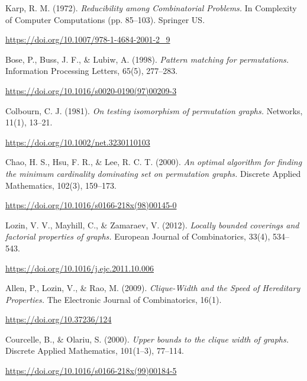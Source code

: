 \begin{thebibliography}{99}
     Karp, R. M. (1972).
    \textit{Reducibility among Combinatorial Problems. }
    In Complexity of Computer Computations (pp. 85–103). Springer US.

    \url{https://doi.org/10.1007/978-1-4684-2001-2_9}

     Bose, P., Buss, J. F., \& Lubiw, A. (1998).
    \textit{Pattern matching for permutations.}
    Information Processing Letters, 65(5), 277–283.

    \url{https://doi.org/10.1016/s0020-0190(97)00209-3}

     Colbourn, C. J. (1981).
    \textit{On testing isomorphism of permutation graphs.}
    Networks, 11(1), 13–21.

    \url{https://doi.org/10.1002/net.3230110103}

     Chao, H. S., Hsu, F. R., \& Lee, R. C. T. (2000).
    \textit{An optimal algorithm for finding the minimum cardinality dominating set on permutation graphs.}
    Discrete Applied Mathematics, 102(3), 159–173.

    \url{https://doi.org/10.1016/s0166-218x(98)00145-0}

     Lozin, V. V., Mayhill, C., \& Zamaraev, V. (2012).
    \textit{Locally bounded coverings and factorial properties of graphs.}
    European Journal of Combinatorics, 33(4), 534–543.

    \url{https://doi.org/10.1016/j.ejc.2011.10.006}

     Allen, P., Lozin, V., \& Rao, M. (2009).
    \textit{Clique-Width and the Speed of Hereditary Properties.}
    The Electronic Journal of Combinatorics, 16(1).

    \url{https://doi.org/10.37236/124}

     Courcelle, B., \& Olariu, S. (2000).
    \textit{Upper bounds to the clique width of graphs.}
    Discrete Applied Mathematics, 101(1–3), 77–114.

    \url{https://doi.org/10.1016/s0166-218x(99)00184-5}

\end{thebibliography}
